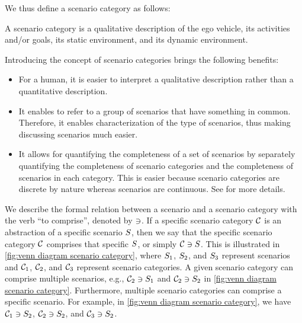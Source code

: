 We thus define a scenario category as follows:
\begin{definition} \label{def:scenario category}
	A scenario category is a qualitative description of the ego vehicle, its activities and/or goals, its static environment, and its dynamic environment.
\end{definition}

Introducing the concept of scenario categories brings the following benefits:
\begin{itemize}
	\item For a human, it is easier to interpret a qualitative description rather than a quantitative description.
	\item It enables to refer to a group of scenarios that have something in common. Therefore, it enables characterization of the type of scenarios, thus making discussing scenarios much easier.
	\item It allows for quantifying the completeness of a set of scenarios by separately quantifying the completeness of scenario categories and the completeness of scenarios in each category.
	This is easier because scenario categories are discrete by nature whereas scenarios are continuous. See \autocite{degelder2019completeness} for more details.
\end{itemize}

We describe the formal relation between a scenario and a scenario category with the verb ``to comprise'', denoted by $\ni$. If a specific scenario category $\mathcal{C}$ is an abstraction of a specific scenario $S$, then we say that the specific scenario category $\mathcal{C}$ comprises that specific $S$, or simply $\mathcal{C} \ni S$. 
This is illustrated in \cref{fig:venn diagram scenario category}, where $S_{1}$, $S_{2}$, and $S_{3}$ represent scenarios and $\mathcal{C}_{1}$, $\mathcal{C}_{2}$, and $\mathcal{C}_{3}$ represent scenario categories. 
A given scenario category can comprise multiple scenarios, e.g., $\mathcal{C}_{2} \ni S_{1}$ and $\mathcal{C}_{2} \ni S_{2}$ in \cref{fig:venn diagram scenario category}. 
Furthermore, multiple scenario categories can comprise a specific scenario.
For example, in \cref{fig:venn diagram scenario category}, we have $\mathcal{C}_{1} \ni S_{2}$, $\mathcal{C}_{2} \ni S_{2}$, and $\mathcal{C}_{3} \ni S_{2}$. 

